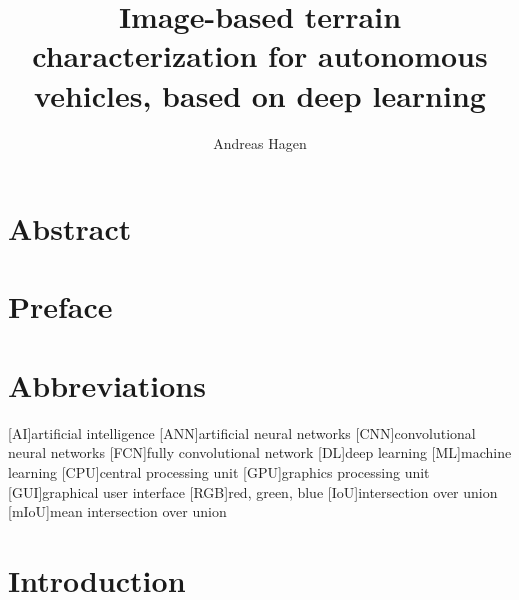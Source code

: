 \documentclass[USenglish]{ifimaster}  %
\title{Image-based terrain characterization for autonomous vehicles, based on deep learning}        %
\author{Andreas Hagen}                      %
\begin{document}
\duoforside[dept={Department of Technology Systems},   %
  program={Cybernetics},  %
  short]                                        %

\frontmatter{}
\chapter*{Abstract}                   %

\tableofcontents{}
\listoffigures{}
\listoftables{}

\chapter*{Preface}
\chapter*{Abbreviations}
\begin{acronym}
        [AI]{artificial intelligence}
        [ANN]{artificial neural networks}
        [CNN]{convolutional neural networks}
        [FCN]{fully convolutional network}
        [DL]{deep learning}
        [ML]{machine learning}
        [CPU]{central processing unit}
        [GPU]{graphics processing unit}
        [GUI]{graphical user interface}
        [RGB]{red, green, blue}
        [IoU]{intersection over union}
        [mIoU]{mean intersection over union}
\end{acronym}


\mainmatter{}
\chapter{Introduction}                  
\end{document}
